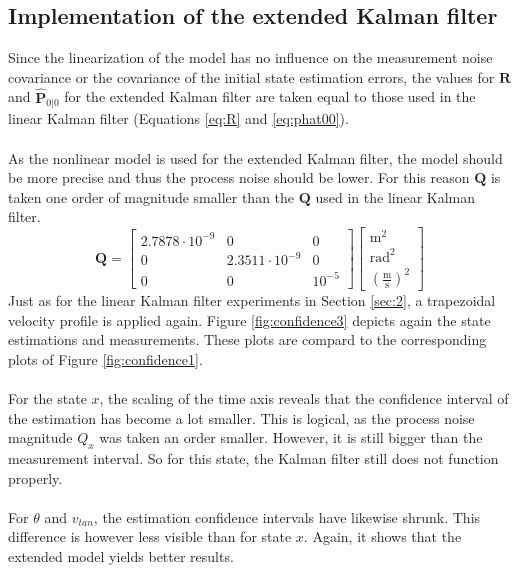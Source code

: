 \documentclass[a4paper,kul]{kulakarticle} %
\begin{document}
\subsection{Implementation of the extended Kalman filter}
Since the linearization of the model has no influence on the measurement noise covariance or the covariance of the initial state estimation errors, the values for $\mathbf{R}$ and $\mathbf{\hat{P}}_{0|0}$ for the extended Kalman filter are taken equal to those used in the linear Kalman filter (Equations \ref{eq:R} and \ref{eq:phat00}).
\\\\
As the nonlinear model is used for the extended Kalman filter, the model should be more precise and thus the process noise should be lower. For this reason $\mathbf{Q}$ is taken one order of magnitude smaller than the $\mathbf{Q}$ used in the linear Kalman filter. 
\begin{equation}
	\mathbf{Q} = \begin{bmatrix}
	2.7878\cdot10^{-9}&0&0\\0&2.3511\cdot10^{-9}&0\\0&0&10^{-5} 
	\end{bmatrix}
	\begin{bmatrix} \text{m}^2 \\ \text{rad}^2 \\ \left(\frac{\text{m}}{\text{s}}\right)^2\end{bmatrix}
\end{equation}
Just as for the linear Kalman filter experiments in Section \ref{sec:2}, a trapezoidal velocity profile is applied again. Figure \ref{fig:confidence3} depicts again the state estimations and measurements. These plots are compard to the corresponding plots of Figure \ref{fig:confidence1}.
\\\\
For the state $x$, the scaling of the time axis reveals that the confidence interval of the estimation has become a lot smaller. This is logical, as the process noise magnitude $Q_x$ was taken an order smaller. However, it is still bigger than the measurement interval. So for this state, the Kalman filter still does not function properly.
\\\\
For $\theta$ and $v_{tan}$, the estimation confidence intervals have likewise shrunk. This difference is however less visible than for state $x$. Again, it shows that the extended model yields better results.
\end{document}
